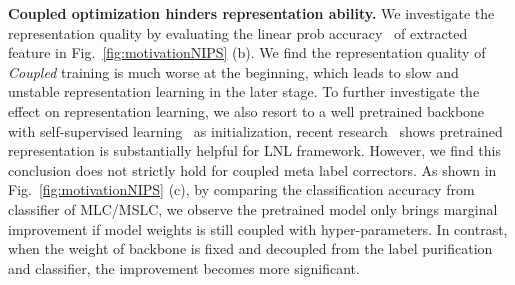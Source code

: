 \documentclass[10pt,twocolumn,letterpaper]{article}
\begin{document}
\noindent  \textbf{Coupled optimization hinders representation ability.} We investigate the representation quality by evaluating the linear prob accuracy~\cite{2020MoCo-v2} of extracted feature in Fig.~\ref{fig:motivationNIPS} (b). We find the representation quality of \emph{Coupled} training is much worse at the beginning, which leads to slow and unstable representation learning in the later stage. To further investigate the effect on representation learning, we also resort to a well pretrained backbone with self-supervised learning~\cite{chen2020simple} as initialization, recent research~\cite{zheltonozhskii2022contrast} shows pretrained representation is substantially helpful for LNL framework. However, we find this conclusion does not strictly hold for coupled meta label correctors. As shown in Fig.~\ref{fig:motivationNIPS} (c), by comparing the classification accuracy from classifier of MLC/MSLC, we observe the pretrained model only brings marginal improvement if model weights is still coupled with hyper-parameters. In contrast, when the weight of backbone is fixed and decoupled from the label purification and classifier, the improvement becomes more significant.
\end{document}
